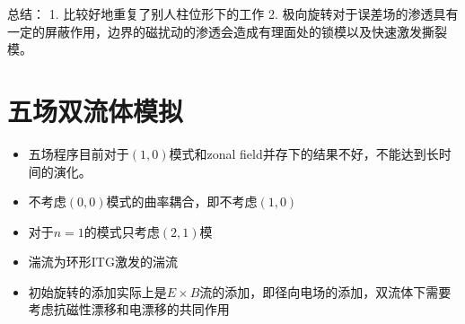 \documentclass[11pt,a4paper]{article}
\begin{document}
	总结： 
	1. 比较好地重复了别人柱位形下的工作
	2. 极向旋转对于误差场的渗透具有一定的屏蔽作用，边界的磁扰动的渗透会造成有理面处的锁模以及快速激发撕裂模。


\part{五场双流体模拟}

\begin{itemize}
	\item 五场程序目前对于$(1,0)$模式和zonal field并存下的结果不好，不能达到长时间的演化。
	\item 不考虑$(0,0)$模式的曲率耦合，即不考虑$(1,0)$
 	\item 对于$n=1$的模式只考虑$(2,1)$模
	\item 湍流为环形ITG激发的湍流
	\item 初始旋转的添加实际上是$E\times B$流的添加，即径向电场的添加，双流体下需要考虑抗磁性漂移和电漂移的共同作用
\end{itemize}
\end{document}

